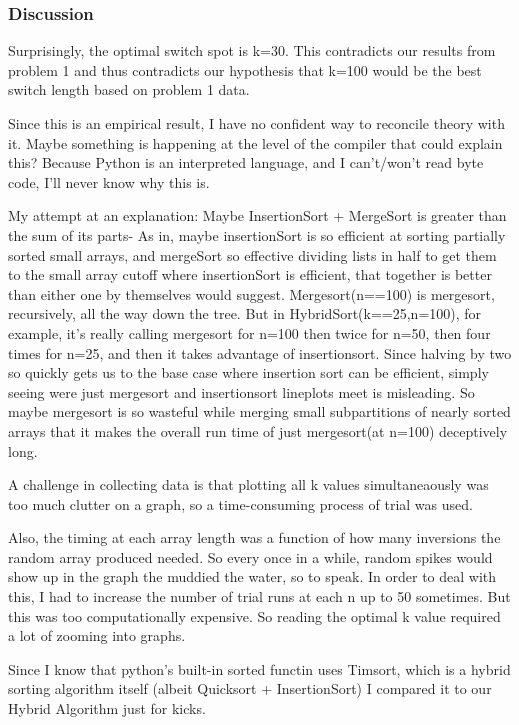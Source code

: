 \documentclass[11pt]{article}
\begin{document}
    \subsubsection{Discussion}\label{discussion}

Surprisingly, the optimal switch spot is k=30. This contradicts our
results from problem 1 and thus contradicts our hypothesis that k=100
would be the best switch length based on problem 1 data.

Since this is an empirical result, I have no confident way to reconcile
theory with it. Maybe something is happening at the level of the
compiler that could explain this? Because Python is an interpreted
language, and I can't/won't read byte code, I'll never know why this is.

My attempt at an explanation: Maybe InsertionSort + MergeSort is greater
than the sum of its parts- As in, maybe insertionSort is so efficient at
sorting partially sorted small arrays, and mergeSort so effective
dividing lists in half to get them to the small array cutoff where
insertionSort is efficient, that together is better than either one by
themselves would suggest. Mergesort(n==100) is mergesort, recursively,
all the way down the tree. But in HybridSort(k==25,n=100), for example,
it's really calling mergesort for n=100 then twice for n=50, then four
times for n=25, and then it takes advantage of insertionsort. Since
halving by two so quickly gets us to the base case where insertion sort
can be efficient, simply seeing were just mergesort and insertionsort
lineplots meet is misleading. So maybe mergesort is so wasteful while
merging small subpartitions of nearly sorted arrays that it makes the
overall run time of just mergesort(at n=100) deceptively long.

A challenge in collecting data is that plotting all k values
simultaneaously was too much clutter on a graph, so a time-consuming
process of trial was used.

Also, the timing at each array length was a function of how many
inversions the random array produced needed. So every once in a while,
random spikes would show up in the graph the muddied the water, so to
speak. In order to deal with this, I had to increase the number of trial
runs at each n up to 50 sometimes. But this was too computationally
expensive. So reading the optimal k value required a lot of zooming into
graphs.

Since I know that python's built-in sorted functin uses Timsort, which
is a hybrid sorting algorithm itself (albeit Quicksort + InsertionSort)
I compared it to our Hybrid Algorithm just for kicks.
\end{document}
